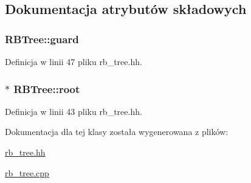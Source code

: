 \subsection{Dokumentacja atrybutów składowych}
\hypertarget{class_r_b_tree_a5c9e9868374d3854a54184d5d669d3d9}{
\subsubsection[{guard}]{ R\-B\-Tree\-::guard\hspace{0.3cm}{\ttfamily [private]}}}\label{class_r_b_tree_a5c9e9868374d3854a54184d5d669d3d9}


Definicja w linii 47 pliku rb\-\_\-tree.\-hh.

\hypertarget{class_r_b_tree_a259103b092340c5b64aabff1d9bc644c}{
\subsubsection[{root}]{$\ast$ R\-B\-Tree\-::root\hspace{0.3cm}{\ttfamily [private]}}}\label{class_r_b_tree_a259103b092340c5b64aabff1d9bc644c}


Definicja w linii 43 pliku rb\-\_\-tree.\-hh.



Dokumentacja dla tej klasy została wygenerowana z plików\-:\begin{DoxyCompactItemize}
\item 
\hyperlink{rb__tree_8hh}{rb\-\_\-tree.\-hh}\item 
\hyperlink{rb__tree_8cpp}{rb\-\_\-tree.\-cpp}\end{DoxyCompactItemize}
